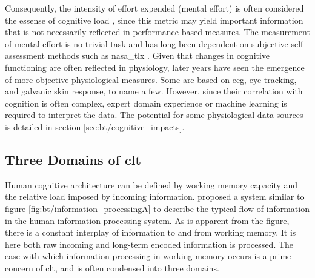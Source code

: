 Consequently, the intensity of effort expended (mental effort) is often considered the essense of cognitive load \cite{hamilton1979}, since this metric may yield important information that is not necessarily reflected in performance-based measures. The measurement of mental effort is no trivial task and has long been dependent on subjective self-assessment methods such as \acrfull{nasa_tlx} \cite{hart1988}. Given that changes in cognitive functioning are often reflected in physiology, later years have seen the emergence of more objective physiological measures. Some are based on \acrfull{eeg}, eye-tracking, and galvanic skin response, to name a few. However, since their correlation with cognition is often complex, expert domain experience or machine learning is required to interpret the data. The potential for some physiological data sources is detailed in section \ref{sec:bt/cognitive_impacts}.

\subsection{Three Domains of \acrlong{clt}} \label{sec:bt/CLT/domains}



Human cognitive architecture can be defined by working memory capacity and the relative load imposed by incoming information. \textcite{sweller1988} proposed a system similar to figure \ref{fig:bt/information_processingA} to describe the typical flow of information in the human information processing system. As is apparent from the figure, there is a constant interplay of information to and from working memory. 
It is here both raw incoming and long-term encoded information is processed.
The ease with which information processing in working memory occurs is a prime concern of \acrshort{clt}, and is often condensed into three domains.

